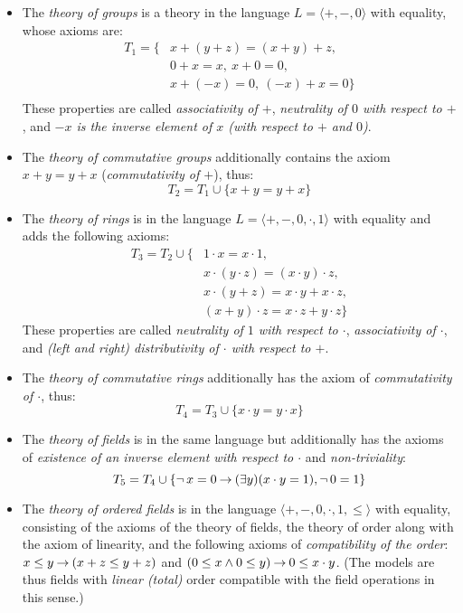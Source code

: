 \begin{itemize}
    \item The \emph{theory of groups} is a theory in the language $L=\langle +,-,0\rangle$ with equality, whose axioms are:
    \begin{align*}
        T_1=\{& x + (y + z) = (x + y) + z,\\
            & 0 + x = x,\ x + 0 = 0,\\
            & x + (-x) = 0,\ (-x) + x = 0\}\\
    \end{align*}
    These properties are called \emph{associativity of $+$}, \emph{neutrality of $0$ with respect to $+$}, and \emph{$-x$ is the inverse element of $x$ (with respect to $+$ and $0$)}.
    \item The \emph{theory of commutative groups} additionally contains the axiom $x+y=y+x$ (\emph{commutativity of $+$}), thus:
    $$
    T_2=T_1\cup\{x+y=y+x\}
    $$
    \item The \emph{theory of rings} is in the language $L=\langle +,-,0,\cdot,1\rangle$ with equality and adds the following axioms:
    \begin{align*}
        T_3=T_2\cup\{   & 1 \cdot x = x \cdot 1,\\
        & x \cdot (y \cdot z) = (x \cdot y) \cdot z,\\
        & x \cdot (y + z) = x \cdot y + x \cdot z,\\
        & (x + y) \cdot z = x \cdot z + y \cdot z\}
    \end{align*}
    These properties are called \emph{neutrality of $1$ with respect to $\cdot$}, \emph{associativity of $\cdot$}, and \emph{(left and right) distributivity of $\cdot$ with respect to $+$}.
    \item The \emph{theory of commutative rings} additionally has the axiom of \emph{commutativity of $\cdot$}, thus:
    $$
    T_4 = T_3 \cup \{x \cdot y = y \cdot x\}
    $$
    \item The \emph{theory of fields} is in the same language but additionally has the axioms of \emph{existence of an inverse element with respect to $\cdot$} and \emph{non-triviality}:
    $$
    T_5 = T_4 \cup \{\neg\,x=0 \mathbin{\rightarrow} (\exists y)(x\cdot y = 1), \neg\,0=1\}
    $$
    \item The \emph{theory of ordered fields} is in the language $\langle +, -, 0,\cdot,1,\leq\rangle$ with equality, consisting of the axioms of the theory of fields, the theory of order along with the axiom of linearity, and the following axioms of \emph{compatibility of the order}: $x\leq y\mathbin{\rightarrow} (x+z\leq y+z)$ and $(0\leq x\land 0\leq y)\mathbin{\rightarrow} 0\leq x\cdot y$. (The models are thus fields with \emph{linear (total)} order compatible with the field operations in this sense.)
\end{itemize}


